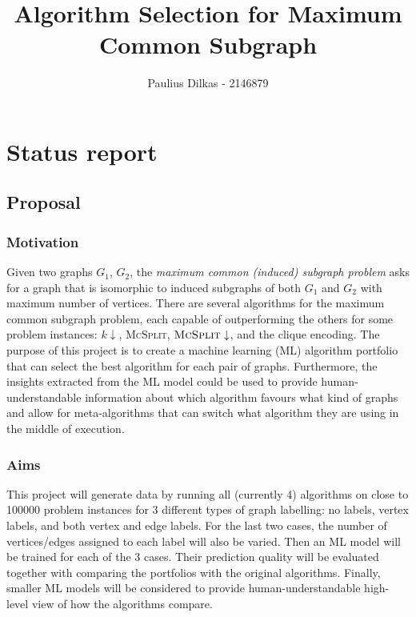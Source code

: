 \documentclass[11pt]{article}
\title{Algorithm Selection for Maximum Common Subgraph}
\author{Paulius Dilkas - 2146879}
\begin{document}
\maketitle

\section{Status report}

\subsection{Proposal}\label{proposal}

\subsubsection{Motivation}\label{motivation}


Given two graphs $G_1$, $G_2$, the \emph{maximum common (induced) subgraph problem}
asks for a graph that is isomorphic to induced subgraphs of both $G_1$ and $G_2$
with maximum number of vertices. There are several algorithms for the maximum
common subgraph problem, each capable of outperforming the others for some
problem instances: $k\downarrow$, \textsc{McSplit},
$\textsc{McSplit}\downarrow$, and the clique encoding. The purpose of this
project is to create a machine learning (ML) algorithm portfolio that can select
the best algorithm for each pair of graphs. Furthermore, the insights extracted
from the ML model could be used to provide human-understandable information
about which algorithm favours what kind of graphs and allow for meta-algorithms
that can switch what algorithm they are using in the middle of execution.

\subsubsection{Aims}\label{aims}


This project will generate data by running all (currently 4) algorithms on close
to 100000 problem instances for 3 different types of graph labelling: no labels,
vertex labels, and both vertex and edge labels. For the last two cases, the
number of vertices/edges assigned to each label will also be varied. Then an ML model
will be trained for each of the 3 cases. Their prediction quality will be
evaluated together with comparing the portfolios with the original algorithms.
Finally, smaller ML models will be considered to provide human-understandable
high-level view of how the algorithms compare.
\end{document}

